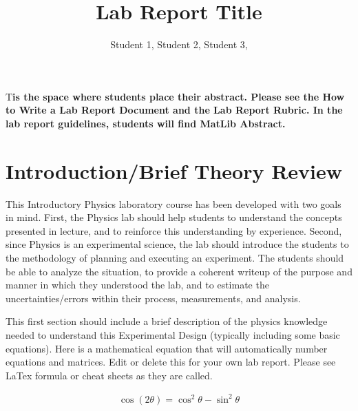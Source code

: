 \documentclass[DIV=calc, paper=a4, fontsize=11pt, twocolumn]{scrartcl}	 %
\title{Lab Report Title}
\author{Student 1, Student 2, Student 3, }
\date{} %
\newcommand{\initial}[1]{ %
\lettrine[lines=3,lhang=0.3,nindent=0em]{
\color{DarkGoldenrod}
{\textsf{#1}}}{}}
\begin{document}
\maketitle %

\thispagestyle{empty} %


\initial{T}\textbf{is the space where students place their abstract. Please see the How to Write a Lab Report Document and the Lab Report Rubric. In the lab report guidelines, students will find MatLib Abstract.}


\section*{Introduction/Brief Theory Review}

This Introductory Physics laboratory course has been developed with two goals in mind. First, the Physics lab should help students to understand the concepts presented in lecture, and to reinforce this understanding by experience. Second, since Physics is an experimental science, the lab should introduce the students to the methodology of planning and executing an experiment. The students should be able to analyze the situation, to provide a coherent writeup of the purpose and manner in which they understood the lab, and to estimate the uncertainties/errors within their process, measurements, and analysis.

This first section should include a brief description of the physics knowledge needed to understand this Experimental Design (typically including some basic equations). Here is a mathematical equation that will automatically number equations and matrices. Edit or delete this for your own lab report. Please see LaTex formula or cheat sheets as they are called.

\begin{align}
\cos (2\theta) = \cos^2 \theta - \sin^2 \theta
\end{align}
\end{document}
